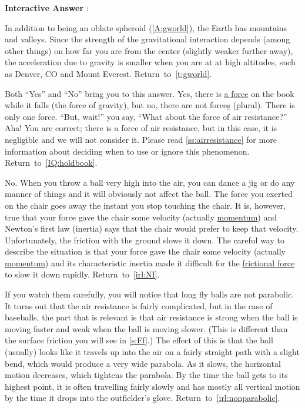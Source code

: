 \documentclass[11pt,letter,openany,makeidx]{book}
\newcommand{\return}[1]{{} \hfill \mbox{Return to \ref{#1}.}}
\newcommand{\autoreturn}[1]{{} \hfill \mbox{Return to \autoref{#1}.}}
\newcounter{AtIQ}
\renewcommand{\theAtIQ}{Answer \arabic{AtIQ}}
\newenvironment{AIQ}{\begin{list}{\textbf{Interactive \theAtIQ}:}{\usecounter{AtIQ} \leftmargin 12pt}}{\end{list}}
\begin{document}
\begin{AIQ}
\item\label{A:gpeaks} In addition to being an oblate spheroid (\ref{A:gworld}), the Earth has mountains and valleys.  Since the strength of the gravitational interaction depends (among other things) on how far you are from the center (slightly weaker further away), the acceleration due to gravity is smaller when you are at at high altitudes, such as Denver, CO and Mount Everest.  \autoreturn{t:gworld}
\item\label{A:falls}  Both ``Yes'' and ``No'' bring you to this answer.  Yes, there is \underline{a force} on the book while it falls (the force of gravity), but no, there are not force\underline{s} (plural).  There is only one force.  ``But, wait!'' you say, ``What about the force of air resistance?''  Aha!   You are correct; there is a force of air resistance, but in this case, it is negligible and we will not consider it.  Please read \autoref{ss:airresistance} for more information about deciding when to use or ignore this phenomenon.  \return{IQ:holdbook}
\item\label{A:chair6} No.  When you throw a ball very high into the air, you can dance a jig or do any manner of things and it will obviously not affect the ball.  The force you exerted on the chair goes away the instant you stop touching the chair.  It is, however, true that your force gave the chair some velocity (actually \hyperref[c:momentum]{momentum}) and Newton's first law (inertia) says that the chair would prefer to keep that velocity.  Unfortunately, the friction with the ground slows it down.  The careful way to describe the situation is that your force gave the chair some velocity (actually \hyperref[c:momentum]{momentum}) and its characteristic inertia made it difficult for the \hyperref[s:Ff]{frictional force} to slow it down rapidly. \autoreturn{irl:NI}
\item\label{A:fly.balls} If you watch them carefully, you will notice that long fly balls are not parabolic.  It turns out that the air resistance is fairly complicated, but in the case of baseballs, the part that is relevant is that air resistance is strong when the ball is moving faster and weak when the ball is moving slower.  (This is different than the surface friction you will see in \autoref{s:Ff}.)  The effect of this is that the ball (usually) looks like it travels up into the air on a fairly straight path with a slight bend, which would produce a very wide parabola.  As it slows, the horizontal motion decreases, which tightens the parabola.  By the time the ball gets to its highest point, it is often travelling fairly slowly and has mostly all vertical motion by the time it drops into the outfielder's glove. \autoreturn{irl:nonparabolic}

\end{AIQ}
\end{document}
